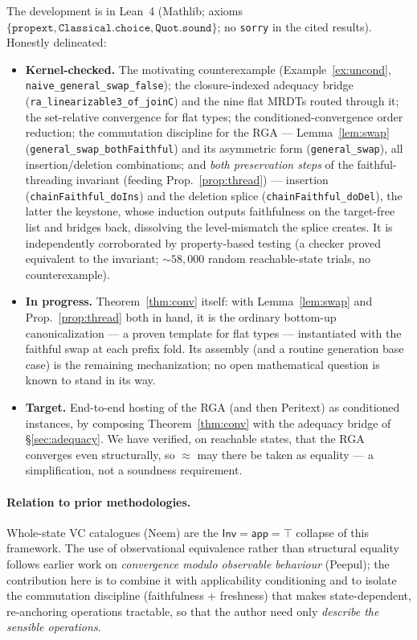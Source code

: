 \documentclass[11pt]{article}
\newcommand{\Inv}{\mathsf{Inv}}
\newcommand{\app}{\mathsf{app}}
\newcommand{\eqobs}{\approx}
\newcommand{\lean}[1]{\texttt{\small #1}}
\begin{document}
The development is in Lean~4 (Mathlib; axioms $\{\mathtt{propext},
\mathtt{Classical.choice}, \mathtt{Quot.sound}\}$; no \texttt{sorry} in the cited
results). Honestly delineated:

\begin{itemize}[leftmargin=1.4em]
\item \textbf{Kernel-checked.} The motivating counterexample
  (Example~\ref{ex:uncond}, \lean{naive\_general\_swap\_false}); the
  closure-indexed adequacy bridge (\lean{ra\_linearizable3\_of\_joinC}) and the
  nine flat MRDTs routed through it; the set-relative convergence for flat types;
  the conditioned-convergence order reduction; the commutation discipline for the
  RGA --- Lemma~\ref{lem:swap} (\lean{general\_swap\_bothFaithful}) and its
  asymmetric form (\lean{general\_swap}), all insertion/deletion combinations; and
  \emph{both preservation steps} of the faithful-threading invariant (feeding
  Prop.~\ref{prop:thread}) --- insertion (\lean{chainFaithful\_doIns}) and the
  deletion splice (\lean{chainFaithful\_doDel}), the latter the keystone,
  whose induction outputs faithfulness on the target-free list and bridges back,
  dissolving the level-mismatch the splice creates. It is independently
  corroborated by property-based testing (a checker proved equivalent to the
  invariant; $\sim\!58{,}000$ random reachable-state trials, no counterexample).
\item \textbf{In progress.} Theorem~\ref{thm:conv} itself: with
  Lemma~\ref{lem:swap} and Prop.~\ref{prop:thread} both in hand, it is the
  ordinary bottom-up canonicalization --- a proven template for flat types ---
  instantiated with the faithful swap at each prefix fold. Its assembly (and a
  routine generation base case) is the remaining mechanization; no open
  mathematical question is known to stand in its way.
\item \textbf{Target.} End-to-end hosting of the RGA (and then Peritext) as
  conditioned instances, by composing Theorem~\ref{thm:conv} with the adequacy
  bridge of \S\ref{sec:adequacy}. We have verified, on reachable states, that the
  RGA converges even structurally, so $\eqobs$ may there be taken as equality ---
  a simplification, not a soundness requirement.
\end{itemize}

\paragraph{Relation to prior methodologies.} Whole-state VC catalogues (Neem)
are the $\Inv=\app=\top$ collapse of this framework. The use of observational
equivalence rather than structural equality follows earlier work on
\emph{convergence modulo observable behaviour} (Peepul); the contribution here is
to combine it with applicability conditioning and to isolate the commutation
discipline (faithfulness + freshness) that makes state-dependent, re-anchoring
operations tractable, so that the author need only \emph{describe the sensible
operations}.
\end{document}
